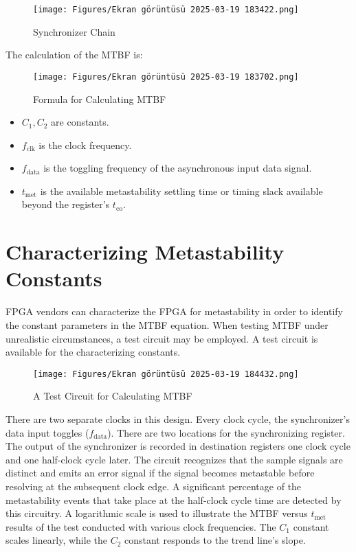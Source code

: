 \documentclass{article}
\begin{document}
\begin{figure}[htbp]
    \centering
    \texttt{[image: Figures/Ekran görüntüsü 2025-03-19 183422.png]}
    \caption{Synchronizer Chain}
    \label{fig:enter-label}
\end{figure}

The calculation of the MTBF is:
\begin{figure}[htbp]
    \centering
    \texttt{[image: Figures/Ekran görüntüsü 2025-03-19 183702.png]}
    \caption{Formula for Calculating MTBF}
    \label{fig:enter-label}
\end{figure}

\begin{itemize}
    \item \( C_1, C_2 \) are constants.
    \item \( f_{\text{clk}} \) is the clock frequency.
    \item \( f_{\text{data}} \) is the toggling frequency of the asynchronous input data signal.
    \item \( t_{\text{met}} \) is the available metastability settling time or timing slack available beyond the register’s \( t_{\text{co}} \).
\end{itemize}

\section{Characterizing Metastability Constants}
FPGA vendors can characterize the FPGA for metastability in order to identify the constant parameters in the MTBF equation. When testing MTBF under unrealistic circumstances, a test circuit may be employed. A test circuit is available for the characterizing constants.

\begin{figure}[htbp]
    \centering
    \texttt{[image: Figures/Ekran görüntüsü 2025-03-19 184432.png]}
    \caption{A Test Circuit for Calculating MTBF}
    \label{fig:enter-label}
\end{figure}
There are two separate clocks in this design. Every clock cycle, the synchronizer's data input toggles (\( f_{\text{data}} \)). There are two locations for the synchronizing register. The output of the synchronizer is recorded in destination registers one clock cycle and one half-clock cycle later. The circuit recognizes that the sample signals are distinct and emits an error signal if the signal becomes metastable before resolving at the subsequent clock edge. A significant percentage of the metastability events that take place at the half-clock cycle time are detected by this circuitry. A logarithmic scale is used to illustrate the MTBF versus \( t_{\text{met}} \) results of the test conducted with various clock frequencies. The \( C_1 \) constant scales linearly, while the \( C_2 \) constant responds to the trend line's slope.
\end{document}
